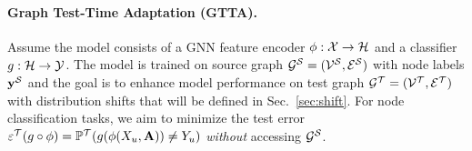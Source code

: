 \paragraph{Graph Test-Time Adaptation (GTTA).} 



Assume the model consists of a GNN feature encoder $\phi:{\mathcal{X}}\rightarrow {\mathcal{H}}$ and a classifier $g: {\mathcal{H}} \rightarrow {\mathcal{Y}}$. The model is trained on source graph ${\mathcal{G}}^{{\mathcal{S}}}=({\mathcal{V}}^{{\mathcal{S}}}, {\mathcal{E}}^{{\mathcal{S}}})$ with node labels $\mathbf{y}^{\mathcal{S}}$ and the goal is to enhance model performance on test graph ${\mathcal{G}}^{{\mathcal{T}}}=({\mathcal{V}}^{{\mathcal{T}}}, {\mathcal{E}}^{{\mathcal{T}}})$ with distribution shifts that will be defined in Sec.~\ref{sec:shift}. For node classification tasks, we aim to minimize the test error $\varepsilon^\mathcal{T}(g\circ\phi)=\mathbb{P}^\mathcal{T}(g(\phi(X_u, {\mathbf{A}}))\neq Y_u)$ \emph{without} accessing ${\mathcal{G}}^{{\mathcal{S}}}$.


